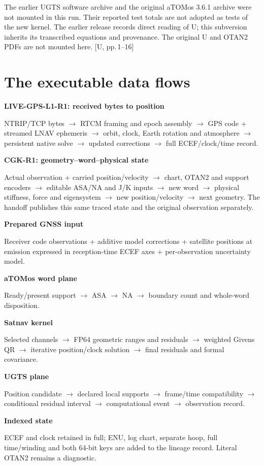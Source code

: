 \documentclass[11pt,a4paper]{article}
\newcommand{\src}[1]{\textcolor{muted}{[U, #1]}}
\begin{document}
The earlier UGTS software archive and the original aTOMos 3.6.1 archive were not mounted
in this run. Their reported test totals are not adopted as tests of the new kernel.
The earlier release records direct reading of U; this subversion inherits its
transcribed equations and provenance. The original U and OTAN2 PDFs are not mounted
here. \src{pp.\,1--16}
\clearpage

\section*{The executable data flows}
\begin{panel}
\textbf{LIVE-GPS-L1-R1: received bytes to position}\par
NTRIP/TCP bytes $\to$ RTCM framing and epoch assembly $\to$ GPS code + streamed
LNAV ephemeris $\to$ orbit, clock, Earth rotation and atmosphere $\to$ persistent
native solve $\to$ updated corrections $\to$ full ECEF/clock/time record.
\end{panel}
\begin{panel}
\textbf{CGK-R1: geometry--word--physical state}\par
Actual observation + carried position/velocity $\to$ chart, OTAN2 and support
encoders $\to$ editable ASA/NA and J/K inputs $\to$ new word $\to$ physical
stiffness, force and eigensystem $\to$ new position/velocity $\to$ next geometry.
The handoff publishes this same traced state and the original observation separately.
\end{panel}
\begin{panel}
\textbf{Prepared GNSS input}\par
Receiver code observations + additive model corrections + satellite positions at
emission expressed in reception-time ECEF axes + per-observation uncertainty model.\par
\textbf{aTOMos word plane}\par
Ready/present support $\to$ ASA $\to$ NA $\to$ boundary count and whole-word disposition.\par
\textbf{Satnav kernel}\par
Selected channels $\to$ FP64 geometric ranges and residuals $\to$ weighted Givens QR
$\to$ iterative position/clock solution $\to$ final residuals and formal covariance.\par
\textbf{UGTS plane}\par
Position candidate $\to$ declared local supports $\to$ frame/time compatibility
$\to$ conditional residual interval $\to$ computational event $\to$ observation record.\par
\textbf{Indexed state}\par
ECEF and clock retained in full; ENU, log chart, separate hoop, full time/winding and
both 64-bit keys are added to the lineage record. Literal OTAN2 remains a diagnostic.
\end{panel}
\end{document}
